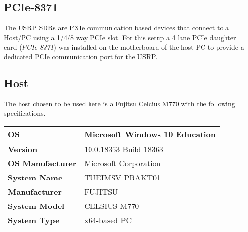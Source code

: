\subsection{PCIe-8371}\label{ssec:PCIe-8371}
The USRP SDRs are PXIe communication based devices that connect to a Host/PC using a 1/4/8 way PCIe slot. For this setup a 4 lane PCIe daughter card (\emph{PCIe-8371}) was installed on the motherboard of the host PC to provide a dedicated PCIe communication port for the USRP.

\subsection{Host}\label{ssec:host}
The host chosen to be used here is a Fujitsu Celcius M770 with the following specifications.

\begin{table}[htb]
    \begin{center}
        \begin{tabular}{|l|l|}
            \hline
            \textbf{OS}                        & Microsoft Windows 10 Education                                                                                            \\ \hline
            \textbf{Version}                   & 10.0.18363 Build 18363                                                                                                    \\ \hline
            \textbf{OS Manufacturer}           & Microsoft Corporation                                                                                                     \\ \hline
            \textbf{System Name}                & TUEIMSV-PRAKT01                                                                                                           \\ \hline
            \textbf{Manufacturer}              & FUJITSU                                                                                                                   \\ \hline
            \textbf{System Model}               & CELSIUS M770                                                                                                              \\ \hline
            \textbf{System Type}                & x64-based PC                                                                                                              \\ \hline

\end{tabular}
\end{center}
\end{table}
